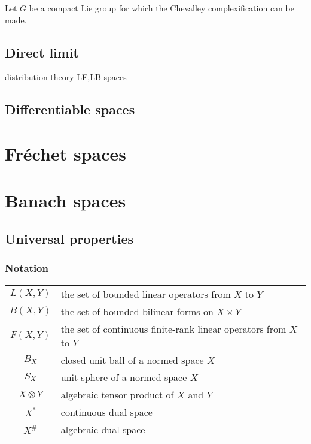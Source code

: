 \documentclass{../../large}
\begin{document}
\begin{prb}
Let $G$ be a compact Lie group for which the Chevalley complexification can be made.
\end{prb}





	




\section{Direct limit}
distribution theory
LF,LB spaces



\section{Differentiable spaces}



\chapter{Fr\'echet spaces}


\chapter{Banach spaces}

\section{Universal properties}
\subsection*{Notation}
\begin{tabular}{cl}
$L(X,Y)$ & the set of bounded linear operators from $X$ to $Y$\\
$B(X,Y)$ & the set of bounded bilinear forms on $X\times Y$\\
$F(X,Y)$ & the set of continuous finite-rank linear operators from $X$ to $Y$\\
$B_X$ & closed unit ball of a normed space $X$\\
$S_X$ & unit sphere of a normed space $X$\\
$X\otimes Y$ & algebraic tensor product of $X$ and $Y$\\
$X^*$ & continuous dual space\\
$X^\#$ & algebraic dual space
\end{tabular}
\end{document}

